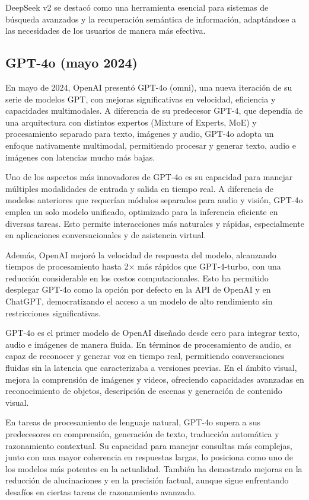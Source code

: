 DeepSeek v2 se destacó como una herramienta esencial para sistemas de búsqueda avanzados y la recuperación semántica de información, adaptándose a las necesidades de los usuarios de manera más efectiva.


\subsection{GPT-4o (mayo 2024)}

En mayo de 2024, OpenAI presentó GPT-4o (omni), una nueva iteración de su serie de modelos GPT, con mejoras significativas en velocidad, eficiencia y capacidades multimodales. 
A diferencia de su predecesor GPT-4, que dependía de una arquitectura con distintos expertos (Mixture of Experts, MoE) y procesamiento separado para texto, imágenes y audio, GPT-4o adopta un enfoque nativamente multimodal, permitiendo procesar y generar texto, audio e imágenes con latencias mucho más bajas.

Uno de los aspectos más innovadores de GPT-4o es su capacidad para manejar múltiples modalidades de entrada y salida en tiempo real. 
A diferencia de modelos anteriores que requerían módulos separados para audio y visión, GPT-4o emplea un solo modelo unificado, optimizado para la inferencia eficiente en diversas tareas. 
Esto permite interacciones más naturales y rápidas, especialmente en aplicaciones conversacionales y de asistencia virtual.

Además, OpenAI mejoró la velocidad de respuesta del modelo, alcanzando tiempos de procesamiento hasta 2× más rápidos que GPT-4-turbo, con una reducción considerable en los costos computacionales. Esto ha permitido desplegar GPT-4o como la opción por defecto en la API de OpenAI y en ChatGPT, democratizando el acceso a un modelo de alto rendimiento sin restricciones significativas.

GPT-4o es el primer modelo de OpenAI diseñado desde cero para integrar texto, audio e imágenes de manera fluida. 
En términos de procesamiento de audio, es capaz de reconocer y generar voz en tiempo real, permitiendo conversaciones fluidas sin la latencia que caracterizaba a versiones previas. 
En el ámbito visual, mejora la comprensión de imágenes y videos, ofreciendo capacidades avanzadas en reconocimiento de objetos, descripción de escenas y generación de contenido visual.

En tareas de procesamiento de lenguaje natural, GPT-4o supera a sus predecesores en comprensión, generación de texto, traducción automática y razonamiento contextual. 
Su capacidad para manejar consultas más complejas, junto con una mayor coherencia en respuestas largas, lo posiciona como uno de los modelos más potentes en la actualidad. 
También ha demostrado mejoras en la reducción de alucinaciones y en la precisión factual, aunque sigue enfrentando desafíos en ciertas tareas de razonamiento avanzado.


